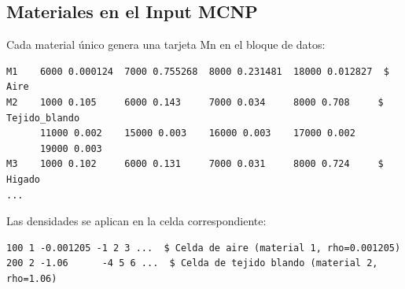 \documentclass[12pt,a4paper]{article}
\begin{document}
\subsection{Materiales en el Input MCNP}

Cada material único genera una tarjeta Mn en el bloque de datos:

\begin{lstlisting}
M1    6000 0.000124  7000 0.755268  8000 0.231481  18000 0.012827  $ Aire
M2    1000 0.105     6000 0.143     7000 0.034     8000 0.708     $ Tejido_blando
      11000 0.002    15000 0.003    16000 0.003    17000 0.002
      19000 0.003
M3    1000 0.102     6000 0.131     7000 0.031     8000 0.724     $ Higado
...
\end{lstlisting}

Las densidades se aplican en la celda correspondiente:

\begin{lstlisting}
100 1 -0.001205 -1 2 3 ...  $ Celda de aire (material 1, rho=0.001205)
200 2 -1.06      -4 5 6 ...  $ Celda de tejido blando (material 2, rho=1.06)
\end{lstlisting}
\end{document}
